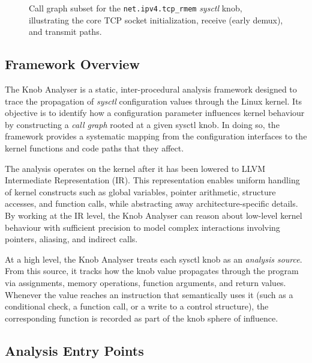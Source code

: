 \begin{figure}[htbp]
{
    }
    \caption{Call graph subset for the \texttt{net.ipv4.tcp\_rmem} \textit{sysctl} knob, illustrating the core TCP socket initialization, receive (early demux), and transmit paths.}
    \label{fig:tcp_rmem_callgraph}
\end{figure}

\subsection{Framework Overview}

The Knob Analyser is a static, inter-procedural analysis framework designed to trace the propagation of \textit{sysctl} configuration values through the Linux kernel.
Its objective is to identify how a configuration parameter influences kernel behaviour by constructing a \textit{call graph} rooted at a given sysctl knob.
In doing so, the framework provides a systematic mapping from the configuration interfaces to the kernel functions and code paths that they affect.

The analysis operates on the kernel after it has been lowered to LLVM~\cite{llvm} Intermediate Representation (IR).
This representation enables uniform handling of kernel constructs such as global variables, pointer arithmetic, structure accesses, and function calls, while abstracting away architecture-specific details.
By working at the IR level, the Knob Analyser can reason about low-level kernel behaviour with sufficient precision to model complex interactions involving pointers, aliasing, and indirect calls.

At a high level, the Knob Analyser treats each sysctl knob as an \textit{analysis source}.
From this source, it tracks how the knob value propagates through the program via assignments, memory operations, function arguments, and return values.
Whenever the value reaches an instruction that semantically uses it (such as a conditional check, a function call, or a write to a control structure), the corresponding function is recorded as part of the knob sphere of influence.

\subsection{Analysis Entry Points}

